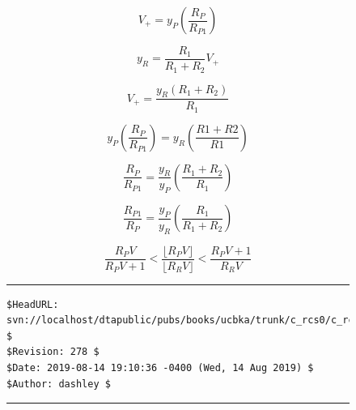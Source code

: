 \begin{equation}
V_{+} = y_P \left( {\frac{R_P}{R_{P1}}} \right)
\end{equation}

\begin{equation}
y_R = \frac{R_1}{R_1 + R_2} V_{+}
\end{equation}

\begin{equation}
V_{+} = \frac{y_R ( R_1 + R_2)}{R_1}
\end{equation}

\begin{equation}
y_P \left( {\frac{R_P}{R_{P1}}} \right) = y_R \left( {\frac{R1 + R2}{R1}} \right)
\end{equation}

\begin{equation}
\frac{R_P}{R_{P1}} = \frac{y_R}{y_P} \left( {\frac{R_1 + R_2}{R_1}} \right)
\end{equation}

\begin{equation}
\frac{R_{P1}}{R_P} = \frac{y_P}{y_R} \left( {\frac{R_1}{R_1 + R_2}} \right)
\end{equation}

\begin{equation}
\frac{R_P V}{R_P V + 1} < \frac{\lfloor R_P V \rfloor}{\lfloor R_R V \rfloor} < \frac{R_P V + 1}{R_R V}
\end{equation}


\vfill
\begin{figure}[b]
\noindent\rule[-0.25in]{\textwidth}{1pt}
\begin{tiny}
\begin{verbatim}
$HeadURL: svn://localhost/dtapublic/pubs/books/ucbka/trunk/c_rcs0/c_rcs0.tex $
$Revision: 278 $
$Date: 2019-08-14 19:10:36 -0400 (Wed, 14 Aug 2019) $
$Author: dashley $
\end{verbatim}
\end{tiny}
\noindent\rule[0.25in]{\textwidth}{1pt}
\end{figure}
%
